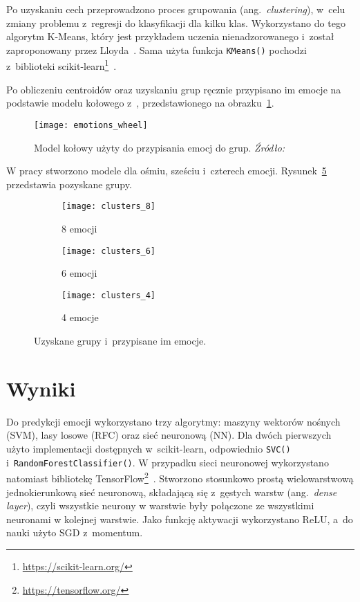 Po uzyskaniu cech przeprowadzono proces grupowania (ang.~\textit{clustering}), w~celu zmiany problemu z~regresji do klasyfikacji dla kilku klas.
Wykorzystano do tego algorytm K-Means, który jest przykładem uczenia nienadzorowanego i~został zaproponowany przez Lloyda~\cite{Lloyd1982}.
Sama użyta funkcja \texttt{KMeans()} pochodzi z~biblioteki scikit-learn\footnote{\url{https://scikit-learn.org/}}~\cite{scikit-learn}.

Po obliczeniu centroidów oraz uzyskaniu grup ręcznie przypisano im emocje na podstawie modelu kołowego z~\cite{Kollias2019}, przedstawionego na obrazku~\ref{fig:emotions-wheel}.

\begin{figure}[h]
    \centering
    \texttt{[image: emotions\_wheel]}
    \caption{Model kołowy użyty do przypisania emocj do grup. \textit{Źródło:~\cite{Kollias2019}}}
    \label{fig:emotions-wheel}
\end{figure}

W pracy stworzono modele dla ośmiu, sześciu i~czterech emocji.
Rysunek~\ref{fig:clusters-all} przedstawia pozyskane grupy.

\begin{figure}[h!]
    \begin{subfigure}{0.5\textwidth}
        \centering
        \texttt{[image: clusters\_8]}
        \caption{8 emocji}
        \label{fig:clusters-8}
    \end{subfigure}
    \begin{subfigure}{0.5\textwidth}
        \centering
        \texttt{[image: clusters\_6]}
        \caption{6 emocji}
        \label{fig:clusters-6}
    \end{subfigure}
    \begin{subfigure}{0.5\textwidth}
        \centering
        \texttt{[image: clusters\_4]}
        \caption{4 emocje}
        \label{fig:clusters-4}
    \end{subfigure}
    \caption{Uzyskane grupy i~przypisane im emocje.}
    \label{fig:clusters-all}
\end{figure}

\section{Wyniki}\label{sec:wyniki}

Do predykcji emocji wykorzystano trzy algorytmy: maszyny wektorów nośnych (SVM), lasy losowe (RFC) oraz sieć neuronową (NN).
Dla dwóch pierwszych użyto implementacji dostępnych w~scikit-learn, odpowiednio \texttt{SVC()} i~\texttt{RandomForestClassifier()}.
W przypadku sieci neuronowej wykorzystano natomiast bibliotekę TensorFlow\footnote{\url{https://tensorflow.org/}}~\cite{Tensorflow2015}.
Stworzono stosunkowo prostą wielowarstwową jednokierunkową sieć neuronową, składającą się z~gęstych warstw (ang.~\textit{dense layer}), czyli wszystkie neurony w warstwie były połączone ze wszystkimi neuronami w kolejnej warstwie.
Jako funkcję aktywacji wykorzystano ReLU, a~do nauki użyto SGD z~momentum.

